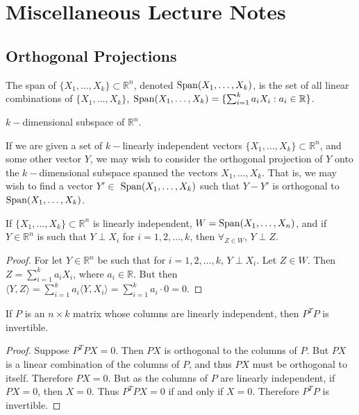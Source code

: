 \documentclass[../main.tex]{subfiles}
\begin{document}
\section{Miscellaneous Lecture Notes}
%
\subsection{Orthogonal Projections}
%
\begin{definition}
The span of $\{X_{1},\hdots, X_{k}\} \subset \mathbb{R}^n$, denoted $\operatorname{Span}(X_{1},\hdots,X_{k})$, is the set of all linear combinations of $\{X_1,\hdots,X_{k}\}$, $\operatorname{Span}(X_{1},\hdots,X_{k})=\{\sum_{i=1}^{k} a_i X_i: a_i \in \mathbb{R}\}$.
\end{definition}
%
\begin{remark}
 $k-$dimensional subspace of $\mathbb{R}^n$.
\end{remark}
%
{
If we are given a set of $k-$linearly independent vectors $\{X_1,\hdots, X_k\}\subset\mathbb{R}^n$, and some other vector $Y$, we may wish to consider the orthogonal projection of $Y$ onto the $k-$dimensional subspace spanned the vectors $X_1,\hdots, X_k$. That is, we may wish to find a vector $Y'\in$ $\operatorname{Span}(X_1,\hdots, X_k)$ such that $Y-Y'$ is orthogonal to $\operatorname{Span}(X_1,\hdots, X_k)$.
}
%
\begin{theorem}
If $\{X_1,\hdots, X_k\}\subset\mathbb{R}^n$ is linearly independent, $W = \operatorname{Span}(X_1,\hdots, X_n)$, and if $Y\in \mathbb{R}^n$ is such that $Y\perp X_i$ for $i=1,2,\hdots, k$, then $\forall_{Z\in W}$, $Y\perp Z$.
\end{theorem}
\begin{proof}
For let $Y\in \mathbb{R}^n$ be such that for $i=1,2,\hdots, k$, $Y\perp X_i$. Let $Z\in W$. Then $Z= \sum_{i=1}^{k} a_i X_i$, where $a_i\in \mathbb{R}$. But then $\langle Y, Z\rangle = \sum_{i=1}^{k} a_i \langle Y, X_i\rangle = \sum_{i=1}^{k} a_i\cdot 0 = 0$. 
\end{proof}
%
\begin{lemma}
If $P$ is an $n\times k$ matrix whose columns are linearly independent, then $P^TP$ is invertible.
\end{lemma}
\begin{proof}
Suppose $P^TPX = 0$. Then $PX$ is orthogonal to the columns of $P$. But $PX$ is a linear combination of the columns of $P$, and thus $PX$ must be orthogonal to itself. Therefore $PX = 0$. But as the columns of $P$ are linearly independent, if $PX = 0$, then $X=0$. Thus $P^TPX = 0$ if and only if $X=0$. Therefore $P^TP$ is invertible.
\end{proof}
\end{document}
